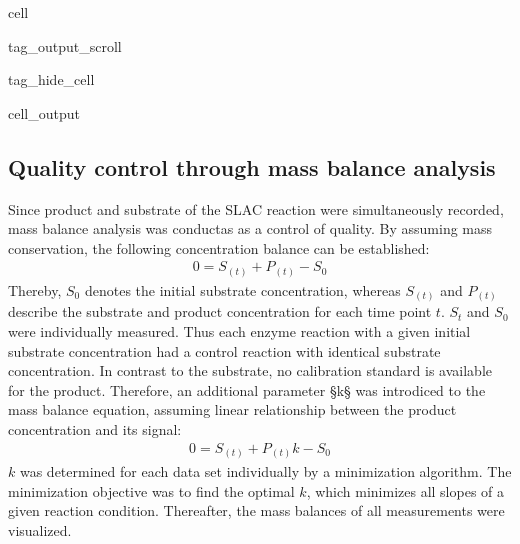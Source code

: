 \documentclass[letterpaper,10pt,english]{jupyterBook}
\begin{document}
\begin{sphinxuseclass}{cell}
\begin{sphinxuseclass}{tag_output_scroll}
\begin{sphinxuseclass}{tag_hide_cell}
\begin{sphinxVerbatimOutput}
\begin{sphinxuseclass}{cell_output}
\end{sphinxuseclass}\end{sphinxVerbatimOutput}

\end{sphinxuseclass}
\end{sphinxuseclass}
\end{sphinxuseclass}

\subsection{Quality control through mass balance analysis}
\label{\detokenize{scenarios/SLAC_kinetic_characterization:quality-control-through-mass-balance-analysis}}
\sphinxAtStartPar
Since product and substrate of the SLAC reaction were simultaneously recorded, mass balance analysis was conductas as a control of quality. By assuming mass conservation, the following concentration balance can be established:
\begin{equation}\label{equation:scenarios/SLAC_kinetic_characterization:mass_balance}
\begin{split}0 = S_{(t)} + P_{(t)} - S_{0}\end{split}
\end{equation}
\sphinxAtStartPar
Thereby, \(S_{0}\) denotes the initial substrate concentration, whereas \(S_{(t)}\) and \(P_{(t)}\) describe the substrate and product concentration for each time point \(t\). \(S_{t}\) and \(S_{0}\) were individually measured. Thus each enzyme reaction with a given initial substrate concentration had a control reaction with identical substrate concentration. In contrast to the substrate, no calibration standard is available for the product. Therefore, an additional parameter §k§ was introdiced to the mass balance equation, assuming linear relationship between the product concentration and its signal:
\begin{equation}\label{equation:scenarios/SLAC_kinetic_characterization:mass_balance_with_k}
\begin{split}0 = S_{(t)} + P_{(t)}k - S_{0}\end{split}
\end{equation}
\sphinxAtStartPar
\(k\) was determined for each data set individually by a minimization algorithm. The minimization objective was to find the optimal \(k\), which minimizes all slopes of a given reaction condition. Thereafter, the mass balances of all measurements were visualized.
\end{document}
